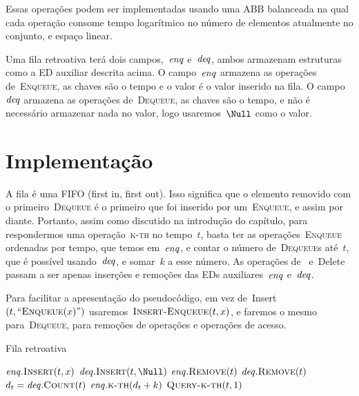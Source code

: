 \documentclass[main.tex]{subfiles}
\begin{document}
Essas operações podem ser implementadas usando uma ABB balanceada na qual cada operação consome tempo logarítmico no número de elementos atualmente no conjunto, e espaço linear.

\newcommand{\deqs}{\V{deq}}
\newcommand{\enqs}{\V{enq}}

Uma fila retroativa terá dois campos,~$\enqs$ e~$\deqs$, ambos armazenam estruturas como a ED auxiliar descrita acima. O campo~$\enqs$ armazena as operações de~\textsc{Enqueue}, as chaves são o tempo e o valor é o valor inserido na fila. O campo~$\deqs$ armazena as operações de~\textsc{Dequeue}, as chaves são o tempo, e não é necessário armazenar nada no valor, logo usaremos~$\Null$ como o valor.

\section{Implementação}

A fila é uma FIFO (first in, first out). Isso significa que o elemento removido com o primeiro~\textsc{Dequeue} é o primeiro que foi inserido por um~\textsc{Enqueue}, e assim por diante. Portanto, assim como discutido na introdução do capítulo, para respondermos uma operação~\textsc{k-th} no tempo~$t$, basta ter as operações~\textsc{Enqueue} ordenadas por tempo, que temos em~$\enqs$, e contar o número de~\textsc{Dequeue}s até~$t$, que é possível usando~$\deqs$, e somar~$k$ a esse número. As operações de~ e~Delete passam a ser apenas inserções e remoções das EDs auxiliares~$\enqs$ e~$\deqs$.

Para facilitar a apresentação do pseudocódigo, em vez de~Insert$(t, ``\Call{Enqueue}{x}")$ usaremos~$\Call{Insert-Enqueue}{t, x}$, e faremos o mesmo para~\textsc{Dequeue}, para remoções de operações e operações de acesso.

\begin{algorithm}
\caption{Fila retroativa} \label{lst:filaretro}
\begin{algorithmic}[1]
		\State $\enqs.\Call{Insert}{t, x}$
	\EndFunction
		\State $\deqs.\Call{Insert}{t, \Null}$
	\EndFunction
		\State $\enqs.\Call{Remove}{t}$
	\EndFunction
		\State $\deqs.\Call{Remove}{t}$
	\EndFunction
		\State $d_t = \deqs.\Call{Count}{t}$ 
		\State \Return $\enqs.\Call{k-th}{d_t + k}$
	\EndFunction
		\State \Return $\Call{Query-k-th}{t, 1}$
	\EndFunction
\end{algorithmic}
\end{algorithm}
\end{document}
